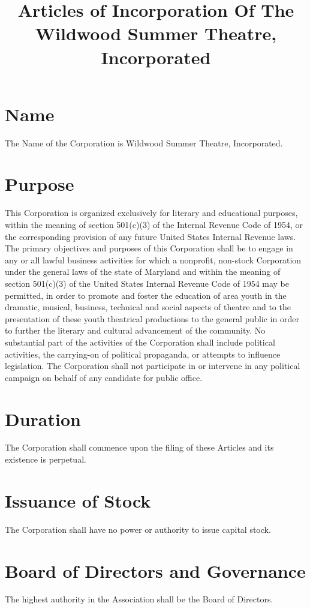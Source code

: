 \documentclass{article}
\title{Articles of Incorporation Of The Wildwood Summer Theatre, Incorporated}
\begin{document}
\maketitle
\section{Name}
The Name of the Corporation is Wildwood Summer Theatre, Incorporated.

\section{Purpose}
This Corporation is organized exclusively for literary and educational
purposes, within the meaning of section 501(c)(3) of the Internal Revenue
Code of 1954, or the corresponding provision of any future United States
Internal Revenue laws. The primary objectives and purposes of this Corporation
shall be to engage in any or all lawful business activities for which a
nonprofit, non-stock Corporation under the general laws of the state of Maryland
and within the meaning of section 501(c)(3) of the United States Internal
Revenue Code of 1954 may be permitted, in order to promote and foster the
education of area youth in the dramatic, musical, business, technical and social
aspects of theatre and to the presentation of these youth theatrical productions
to the general public in order to further the literary and cultural advancement
of the community.  No substantial part of the activities of the Corporation
shall include political activities, the carrying-on of political propaganda, or
attempts to influence legislation.  The Corporation shall not participate in or
intervene in any political campaign on behalf of any candidate for public
office.

\section{Duration}
The Corporation shall commence upon the filing of these Articles and its
existence is perpetual.

\section{Issuance of Stock}
The Corporation shall have no power or authority to issue capital stock.

\section{Board of Directors and Governance}
The highest authority in the Association shall be the Board of Directors.
\end{document}
